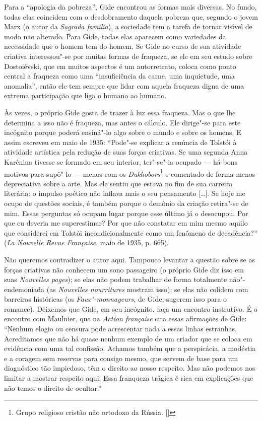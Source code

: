 Para a ``apologia da pobreza'', Gide encontrou as formas mais diversas.
No fundo, todas elas coincidem com o desdobramento daquela pobreza que,
segundo o jovem Marx (o autor da \emph{Sagrada família}), a sociedade
tem a tarefa de tornar visível de modo não alterado. Para Gide, todas elas
aparecem como variedades da necessidade que o homem tem do homem. Se
Gide no curso de sua atividade criativa interessou"-se por muitas formas
de fraqueza, se ele em seu estudo sobre Dostoiévski, que em muitos
aspectos é um autorretrato, coloca como ponto central a fraqueza como
uma ``insuficiência da carne, uma inquietude, uma anomalia'', então ele
tem sempre que lidar com aquela fraqueza digna de uma extrema
participação que liga o humano ao humano.

Às vezes, o próprio Gide gosta de trazer à luz essa fraqueza. Mas o que
lhe determina a isso não é fraqueza, mas antes o cálculo. Ele dirige"-se para
este incógnito porque poderá ensiná"-lo algo sobre o mundo e sobre os
homens. E assim escreveu em maio de 1935: ``Pode"-se explicar a renúncia
de Tolstói à atividade artística pela redução de suas forças criativas.
Se uma segunda Anna Karênina tivesse se formado em seu interior,
ter"-se"-ia ocupado --- há bons motivos para supô"-lo --- menos com os
\emph{Dukhobors}\footnote{Grupo religioso cristão não ortodoxo da Rússia. []} e comentado de forma menos depreciativa sobre a arte.
Mas ele sentiu que estava no fim de sua carreira literária: o impulso
poético não inflava mais o seu pensamento [\ldots{}]. Se hoje me ocupo de
questões sociais, é também porque o demônio da criação retira"-se de mim.
Essas perguntas só ocupam lugar porque esse último já o desocupou. Por
que eu deveria me superestimar? Por que não constatar em mim mesmo
aquilo que considerei em Tolstói incondicionalmente como um fenômeno de
decadência?'' (\emph{La Nouvelle Revue Française}, maio de 1935, p.
665).

Não queremos contradizer o autor aqui. Tampouco levantar a questão sobre
se as forças criativas não conhecem um sono passageiro (o próprio Gide
diz isso em suas \emph{Nouvelles pages}); se elas não podem trabalhar de
forma totalmente não"-endemoniada (as \emph{Nouvelles nourritures}
mostram isso); se elas não colidem com barreiras históricas (os
\emph{Faux"-monnayeurs}, de Gide, sugerem isso para o romance). Deixemos
que Gide, em seu incógnito, faça um encontro instrutivo. É o encontro
com Maulnier, que na \emph{Action française} cita essas afirmações de
Gide: ``Nenhum elogio ou censura pode acrescentar nada a essas linhas
estranhas. Acreditamos que não há quase nenhum exemplo de um criador
que se coloca em evidência com uma tal confissão. Achamos também que a
perspicácia, a modéstia e a coragem sem reservas para consigo mesmo, que
servem de base para um diagnóstico tão impiedoso, têm o direito ao nosso
respeito. Mas não podemos nos limitar a mostrar respeito aqui. Essa
franqueza trágica é rica em explicações que não temos o direito de
ocultar.''

